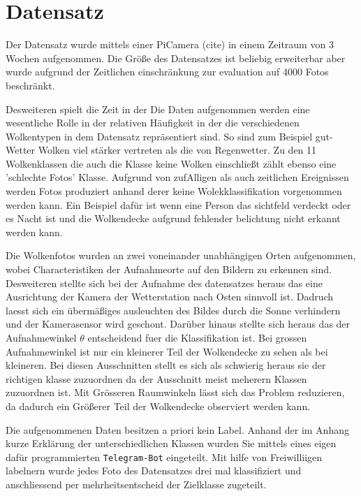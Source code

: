 \section{Datensatz}
\label{sec:02_Datensatz}

Der Datensatz wurde mittels einer PiCamera (cite) in einem Zeitraum von 3 Wochen
aufgenommen. 
Die Größe des Datensatzes ist beliebig erweiterbar aber wurde aufgrund der
Zeitlichen einschränkung zur evaluation auf \num{4000} Fotos beschränkt. 

Desweiteren spielt die Zeit in der Die Daten aufgenommen werden eine wesentliche
Rolle in der relativen Häufigkeit in der die verschiedenen Wolkentypen in dem
Datensatz repräsentiert sind. 
So sind zum Beispiel gut-Wetter Wolken viel stärker vertreten als die von
Regenwetter. 
Zu den 11 Wolkenklassen die auch die Klasse keine Wolken einschließt zählt
ebenso eine 'schlechte Fotos' Klasse. 
Aufgrund von zufAlligen als auch zeitlichen Ereignissen werden Fotos produziert
anhand derer keine Wolekklassifikation vorgenommen werden kann.
Ein Beispiel dafür ist wenn eine Person das sichtfeld verdeckt oder es Nacht ist
und die Wolkendecke aufgrund fehlender belichtung nicht erkannt werden kann. 

Die Wolkenfotos wurden an zwei voneinander unabhängigen Orten aufgenommen, wobei
Characteristiken der Aufnahmeorte auf den Bildern zu erkennen sind.
Desweiteren stellte sich bei der Aufnahme des datensatzes heraus das eine
Ausrichtung der Kamera der Wetterstation nach Osten sinnvoll ist.
Dadruch laesst sich ein übermäßiges ausleuchten des Bildes durch die Sonne
verhindern und der Kamerasensor wird geschont.
Darüber hinaus stellte sich heraus das der Aufnahmewinkel $\theta$ entscheidend
fuer die Klassifikation ist. 
Bei grossen Aufnahmewinkel ist nur ein kleinerer Teil der Wolkendecke zu sehen
als bei kleineren.
Bei diesen Ausschnitten stellt es sich als schwierig heraus sie der richtigen
klasse zuzuordnen da der Ausschnitt meist meherern Klassen zuzuordnen ist. 
Mit Grösseren Raumwinkeln lässt sich das Problem reduzieren, da dadurch ein
Größerer Teil der Wolkendecke observiert werden kann. 

Die aufgenommenen Daten besitzen a priori kein Label.
Anhand der im Anhang kurze Erklärung der unterschiedlichen Klassen wurden Sie
mittels eines eigen dafür programmierten \texttt{Telegram-Bot} eingeteilt.
Mit hilfe von Freiwilliigen labelnern wurde jedes Foto des Datensatzes drei mal
klassifiziert und anschliessend per mehrheitsentscheid der Zielklasse zugeteilt.
